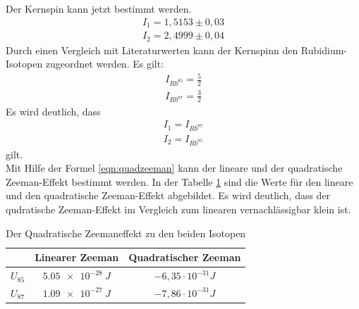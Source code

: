 Der Kernspin kann jetzt bestimmt werden.
\begin{align*}
  I_1=1,5153\pm0,03\\
  I_2=2,4999\pm0,04
\end{align*}
Durch einen Vergleich mit Literaturwerten \cite{Spin} kann der Kernspinn den Rubidium-Isotopen zugeordnet werden.
Es gilt:
\begin{align*}
  I_{Rb^{85}}=\frac{5}{2}\\
  I_{Rb^{87}}=\frac{3}{2}
\end{align*}
Es wird deutlich, dass
\begin{align*}
  I_1=I_{Rb^{87}}\\
  I_2=I_{Rb^{85}}
\end{align*}
gilt.\\

Mit Hilfe der Formel \ref{eqn:quadzeeman} kann der lineare und der quadratische Zeeman-Effekt bestimmt werden.
In der Tabelle \ref{tab.QZ} sind die Werte für den lineare und den quadratische Zeeman-Effekt abgebildet.
Es wird deutlich, dass der qudratische Zeeman-Effekt im Vergleich zum linearen vernachlässigbar klein ist.
\FloatBarrier

\begin{table}
  \centering
  \caption{Der Quadratische Zeemaneffekt zu den beiden Isotopen}
  \label{tab.QZ}
    \begin{tabular}{c c c}
      \toprule
        & Linearer Zeeman    &Quadratischer Zeeman\\
      \midrule
      \midrule
      $U_{85}$ & $\SI{5.05e-28}{J}$ & $-6,35\cdot 10^{-31}\si{J}$\\
      $U_{87}$ & $\SI{1.09e-27}{J}$ & $-7,86\cdot 10^{-31}\si{J}$\\
      \bottomrule
    \end{tabular}
\end{table}


%
